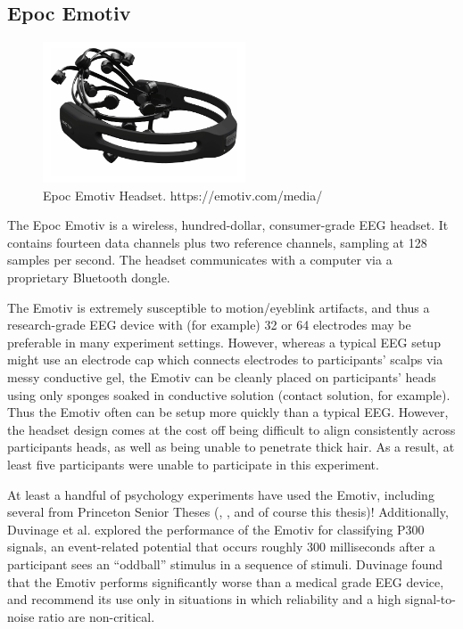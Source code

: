 \documentclass[12pt]{report}
\begin{document}
\subsection{Epoc Emotiv}
	\begin{figure}
		\includegraphics[width=6cm]{emotiv}	
		\centering
		\caption{Epoc Emotiv Headset. https://emotiv.com/media/}
	\end{figure}
	
	The Epoc Emotiv\cite{emotiv} is a wireless, hundred-dollar, consumer-grade EEG headset.  It contains fourteen data channels plus two reference channels, sampling at 128 samples per second.  The headset communicates with a computer via a proprietary Bluetooth dongle.
	
	The Emotiv is extremely susceptible to motion/eyeblink artifacts, and thus a research-grade EEG device with (for example) 32 or 64 electrodes may be preferable in many experiment settings.  However, whereas a typical EEG setup might use an electrode cap which connects electrodes to participants' scalps via messy conductive gel, the Emotiv can be cleanly placed on participants' heads using only sponges soaked in conductive solution (contact solution, for example).  Thus the Emotiv often can be setup more quickly than a typical EEG.  However, the headset design comes at the cost off being difficult to align consistently across participants heads, as well as being unable to penetrate thick hair.  As a result, at least five participants were unable to participate in this experiment.
	
	At least a handful of psychology experiments have used the Emotiv, including several from Princeton Senior Theses (\cite{Rafidi}, \cite{Adelson}, and of course this thesis)!  Additionally, Duvinage et al.\cite{Duvinage} explored the performance of the Emotiv for classifying P300 signals, an event-related potential that occurs roughly 300 milliseconds after a participant sees an ``oddball'' stimulus in a sequence of stimuli\cite{p300}.  Duvinage found that the Emotiv performs significantly worse than a medical grade EEG device, and recommend its use only in situations in which reliability and a high signal-to-noise ratio are non-critical.
	
\end{document}
